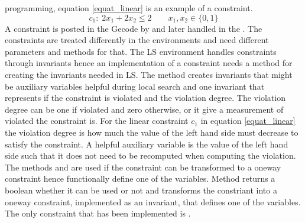 programming, equation \ref{equat_linear} is an example of a  constraint. 
\begin{equation}
 c_1: \; 2x_1 + 2x_2 \leq 2  \qquad x_1,x_2 \in \{0,1\}
\end{equation} \label{equat_linear} \noindent
A constraint is posted in the Gecode  by  and later handled in the 
. The 
constraints are treated differently in the environments and need different parameters and methods for that. The LS 
environment handles constraints through invariants hence an implementation of a constraint needs a method for 
creating the invariants needed in LS. The method  creates invariants that 
might be auxiliary variables helpful during local search and one invariant that represents 
if the constraint is violated and the violation degree. The violation degree can be one if violated and zero 
otherwise, or it give a measurement of violated the constraint is. For the linear constraint $c_1$ in equation 
\ref{equat_linear} the violation degree is how much the value of the left hand side must decrease to satisfy the 
constraint. A helpful auxiliary variable is the value of the left hand side such that it does not need to be recomputed 
when computing the violation. \\
The methods  and  are used if the constraint can be transformed 
to a oneway constraint hence functionally define one of the variables. Method  returns a 
boolean whether it can be used or not and  transforms the constriant into a oneway constraint, 
implemented as an invariant, that defines one of the variables. The only constraint that has been implemented is 
. 

